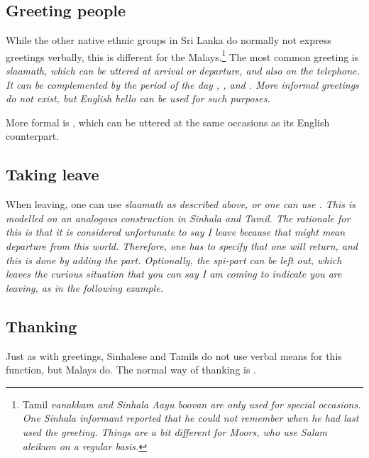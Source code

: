 \subsection{Greeting people}\label{sec:pragm:...greetpeople}
While the other native ethnic groups in Sri Lanka do normally not express greetings verbally, this is different for the Malays.\footnote{Tamil \em vanakkam \em and Sinhala \em Aayu boovan \em are only used for special occasions. One Sinhala informant reported that he could not remember when he had last used the greeting. Things are a bit different for Moors, who use \em Salam aleikum \em on a regular basis.}
The most common greeting is \em slaamath\em, which can be uttered at arrival or departure, and also on the telephone. It can be complemented by the period of the day , , and . More informal greetings do not exist, but English \em hello \em can be used for such purposes.

More formal is , which can be uttered at the same occasions as its English counterpart.


\subsection{Taking leave}\label{sec:pragm:...takeleave}
When leaving, one can use \em slaamath \em as described above, or one can use . This is modelled on an analogous construction in Sinhala and Tamil. The rationale for this is that it is considered unfortunate to say \em I leave \em because that might mean departure from this world. Therefore, one has to specify that one will return, and this is done by adding the  part. Optionally, the \em spi-\em part can be left out, which leaves the curious situation that you can say \em I am coming \em to indicate you are leaving, as in the following example.


\subsection{Thanking}\label{sec:pragm:...thank}
Just as with greetings, Sinhalese and Tamils do not use verbal means for this function, but Malays do. The normal way of thanking is .

